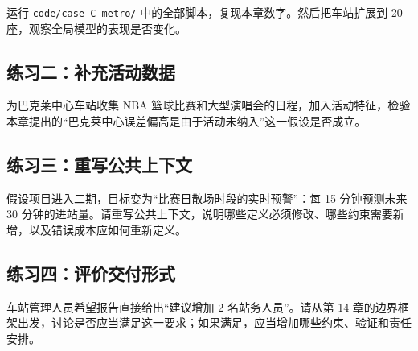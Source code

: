 运行 \texttt{code/case\_C\_metro/} 中的全部脚本，复现本章数字。然后把车站扩展到 20 座，观察全局模型的表现是否变化。

\subsection*{练习二：补充活动数据}

为巴克莱中心车站收集 NBA 篮球比赛和大型演唱会的日程，加入活动特征，检验本章提出的“巴克莱中心误差偏高是由于活动未纳入”这一假设是否成立。

\subsection*{练习三：重写公共上下文}

假设项目进入二期，目标变为“比赛日散场时段的实时预警”：每 15 分钟预测未来 30 分钟的进站量。请重写公共上下文，说明哪些定义必须修改、哪些约束需要新增，以及错误成本应如何重新定义。

\subsection*{练习四：评价交付形式}

车站管理人员希望报告直接给出“建议增加 2 名站务人员”。请从第 14 章的边界框架出发，讨论是否应当满足这一要求；如果满足，应当增加哪些约束、验证和责任安排。
